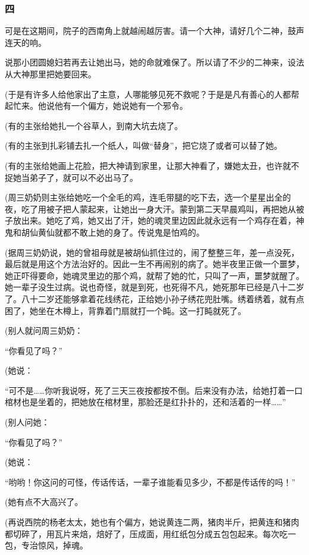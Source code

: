 \subsubsection*{四}
\par 可是在这期间，院子的西南角上就越闹越厉害。请一个大神，请好几个二神，鼓声连天的响。
\par 说那小团圆媳妇若再去让她出马，她的命就难保了。所以请了不少的二神来，设法从大神那里把她要回来。
\par (于是有许多人给他家出了主意，人哪能够见死不救呢？于是是凡有善心的人都帮起忙来。他说他有一个偏方，她说她有一个邪令。
\par (有的主张给她扎一个谷草人，到南大坑去烧了。
\par (有的主张到扎彩铺去扎一个纸人，叫做“替身”，把它烧了或者可以替了她。
\par (有的主张给她画上花脸，把大神请到家里，让那大神看了，嫌她太丑，也许就不捉她当弟子了，就可以不必出马了。
\par (周三奶奶则主张给她吃一个全毛的鸡，连毛带腿的吃下去，选一个星星出全的夜，吃了用被子把人蒙起来，让她出一身大汗。蒙到第二天早晨鸡叫，再把她从被子放出来。她吃了鸡，她又出了汗，她的魂灵里边因此就永远有一个鸡存在着，神鬼和胡仙黄仙就都不敢上她的身了。传说鬼是怕鸡的。
\par (据周三奶奶说，她的曾祖母就是被胡仙抓住过的，闹了整整三年，差一点没死，最后就是用这个方法治好的。因此一生不再闹别的病了。她半夜里正做一个噩梦，她正吓得要命，她魂灵里边的那个鸡，就帮了她的忙，只叫了一声，噩梦就醒了。她一辈子没生过病。说也奇怪，就是到死，也死得不凡，她死那年已经是八十二岁了。八十二岁还能够拿着花线绣花，正给她小孙子绣花兜肚嘴。绣着绣着，就有点困了，她坐在木樽上，背靠着门扇就打一个盹。这一打盹就死了。
\par (别人就问周三奶奶：
\par “你看见了吗？”
\par (她说：
\par “可不是……你听我说呀，死了三天三夜按都按不倒。后来没有办法，给她打着一口棺材也是坐着的，把她放在棺材里，那脸还是红扑扑的，还和活着的一样……”
\par (别人问她：
\par “你看见了吗？”
\par (她说：
\par “哟哟！你这问的可怪，传话传话，一辈子谁能看见多少，不都是传话传的吗！”
\par (她有点不大高兴了。
\par (再说西院的杨老太太，她也有个偏方，她说黄连二两，猪肉半斤，把黄连和猪肉都切碎了，用瓦片来焙，焙好了，压成面，用红纸包分成五包包起来。每次吃一包，专治惊风，掉魂。
